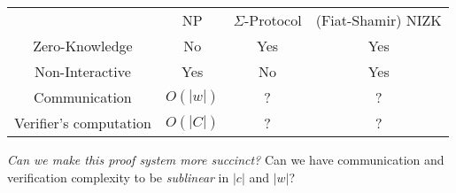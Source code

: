 \begin{center}
    \begin{tabular}{c|c|c|c}
        & NP & $\Sigma$-Protocol & (Fiat-Shamir) NIZK \\
        Zero-Knowledge & No & Yes & Yes\\
        Non-Interactive & Yes & No & Yes\\
        Communication & $O(|w|)$ & ? & ? \\
        Verifier's computation & $O(|C|)$ & ? & ?\\
    \end{tabular}
\end{center}

\emph{Can we make this proof system more succinct?} Can we have communication and verification complexity to be \emph{sublinear} in $|c|$ and $|w|$?
